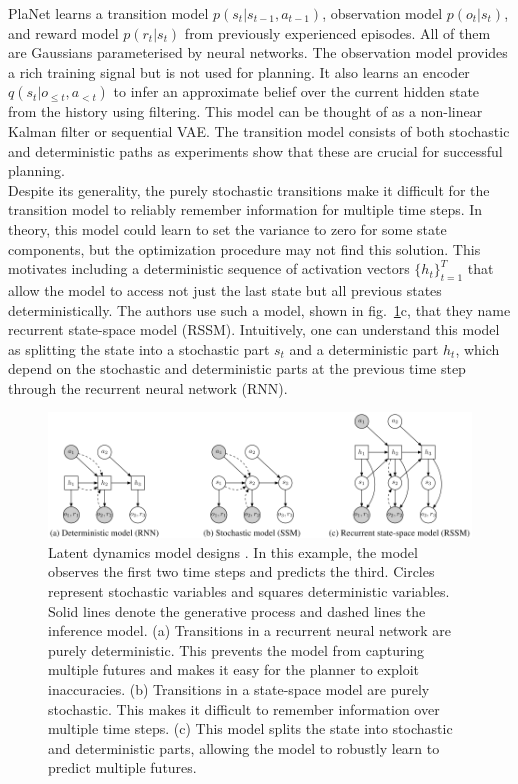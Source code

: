 PlaNet learns a transition model $p(s_t | s_{t-1}, a_{t-1})$, observation model $p(o_t | s_t)$, and reward model $p(r_t | s_t)$ from previously experienced episodes. All of them are Gaussians parameterised by neural networks. The observation model provides a rich training signal but is not used for planning. It also learns an encoder $q(s_t | o_{\leqslant t}, a_{< t})$ to infer an approximate belief over the current hidden state from the history using filtering. This model can be thought of as a non-linear Kalman filter or sequential VAE. The transition model consists of both stochastic and deterministic paths as experiments show that these are crucial for successful planning. \\
Despite its generality, the purely stochastic transitions make it difficult for the transition model to reliably remember information for multiple time steps. In theory, this model could learn to set the variance to zero for some state components, but the optimization procedure may not find this solution. This motivates including a deterministic sequence of activation vectors $\{h_t\}^T_{t=1}$ that allow the model to access not just the last state but all previous states deterministically. The authors use such a model, shown in fig.~\ref{Fig.PlaNetModelDesignes}c, that they name recurrent state-space model (RSSM). Intuitively, one can understand this model as splitting the state into a stochastic part $s_t$ and a deterministic part $h_t$, which depend on the stochastic and deterministic parts at the previous time step through the recurrent neural network (RNN).

\begin{figure}[H]
\includegraphics[width=1.0\textwidth,keepaspectratio]{figures/PlaNet/models.png}
\caption[PlaNet latent dynamics model designs]{Latent dynamics model designs \protect\cite{Algo.PlaNet}. In this example, the model observes the first two time steps and predicts the third. Circles represent stochastic variables and squares deterministic variables. Solid lines denote the generative process and dashed lines the inference model. (a) Transitions in a recurrent neural network are purely deterministic. This prevents the model from capturing multiple futures and makes it easy for the planner to exploit inaccuracies. (b) Transitions in a state-space model are purely stochastic. This makes it difficult to remember information over multiple time steps. (c) This model splits the state into stochastic and deterministic parts, allowing the model to robustly learn to predict multiple futures.}
\label{Fig.PlaNetModelDesignes}
\end{figure}

